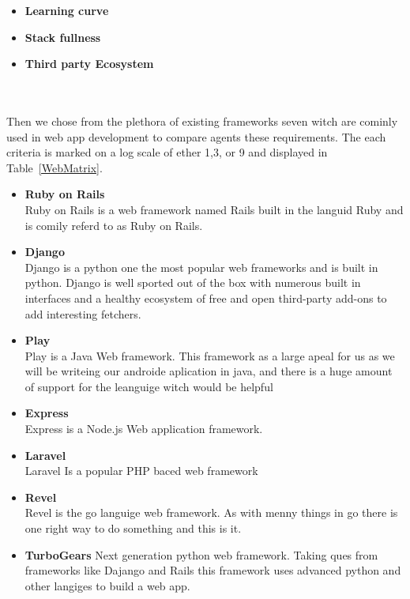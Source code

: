 \documentclass[Letter,11pt]{article}
\begin{document}
		\begin{minipage}[t]{0.5\textwidth}
		\begin{itemize}
			\item \textbf{Learning curve} \\
			
			
			\item \textbf{Stack fullness} \\
			
			\item \textbf{Third party Ecosystem}\\
			
			
		\end{itemize}
		\end{minipage}\\
		\\
		Then we chose from the plethora of existing frameworks seven witch are cominly used in web app development to compare agents these requirements. The each criteria is marked on a log scale of ether 1,3, or 9 and displayed in Table~\ref{WebMatrix}.
		
		\begin{itemize}
			\item \textbf{Ruby on Rails} \\
			Ruby on Rails is a web framework named Rails built in the languid Ruby and is comily referd to as Ruby on Rails. 
			\item \textbf{Django} \\
			Django is a python one the most popular web frameworks and is built in python. Django is well sported out of the box with numerous built in interfaces and a healthy ecosystem of free and open third-party add-ons to add interesting fetchers.
			\item \textbf{Play} \\
			Play is a Java Web framework. This framework as a large apeal for us as we will be writeing our androide aplication in java, and there is a huge amount of support for the leanguige witch would be helpful
			\item  \textbf{Express}\\
			Express is a Node.js Web application framework.
			\item \textbf{Laravel} \\
			Laravel Is a popular PHP baced web framework
			\item \textbf{Revel} \\
			Revel is the go languige web framework. As with menny things in go there is one right way to do something and this is it.
			\item \textbf{TurboGears}
			Next generation python web framework. Taking ques from frameworks like Dajango and Rails this framework uses advanced python and other langiges to build a web app.
		\end{itemize}
		
\end{document}
